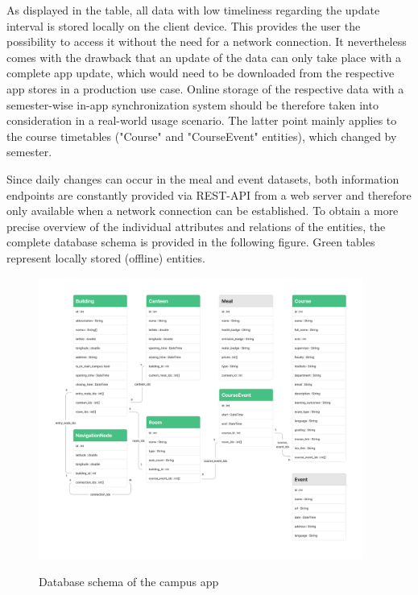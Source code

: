 As displayed in the table, all data with low timeliness regarding the update interval is stored locally on the client device. This provides the user the possibility to access it without the need for a network connection. It nevertheless comes with the drawback that an update of the data can only take place with a complete app update, which would need to be downloaded from the respective app stores in a production use case. Online storage of the respective data with a semester-wise in-app synchronization system should be therefore taken into consideration in a real-world usage scenario. The latter point mainly applies to the course timetables ("Course" and "CourseEvent" entities), which changed by semester.

Since daily changes can occur in the meal and event datasets, both information endpoints are constantly provided via REST-API from a web server and therefore only available when a network connection can be established. To obtain a more precise overview of the individual attributes and relations of the entities, the complete database schema is provided in the following figure. Green tables represent locally stored (offline) entities.

\begin{figure}[H]
	\centering
	\includegraphics[width=0.95\textwidth]{images/database_schema.png}\\
	\caption{Database schema of the campus app}
	\label{fig:database_schema}
\end{figure}

